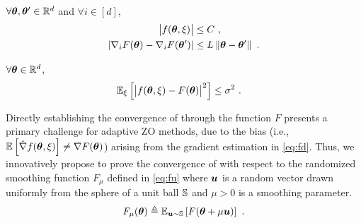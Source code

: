 \begin{assumption}\label{assump:1}
$\forall {\bm{\theta}},{\bm{\theta}}' \in \mathbb{R}^d$ and $\forall i \in [d]$,
\begin{align}
\big|f({\bm{\theta}}, \xi)\big| &\leq C \ , \\[1pt]
\left|\nabla_i F({\bm{\theta}}) - \nabla_i F({\bm{\theta}}')\right| &\leq L\left\|{\bm{\theta}} - {\bm{\theta}}'\right\| \ . \label{eq:smoothness}
\end{align}
\end{assumption} 
\begin{assumption}\label{assump:2}
$\forall{{\bm{\theta}}} \in \mathbb{R}^d$,
\begin{align}
\mathbb{E}_{\xi}\left[\big|f({\bm{\theta}}, \xi) - F({\bm{\theta}})\big|^2\right] &\leq \sigma^2 \ . \label{eq:variance}
\end{align}
\end{assumption}

Directly establishing the convergence of \ours{} through the function $F$ presents a primary challenge for adaptive ZO methods, due to the bias (i.e., $\mathbb{E}\left[\hat{\nabla}f({\bm{\theta}},\xi)\right] \neq \nabla F({\bm{\theta}})$) arising from the gradient estimation in \eqref{eq:fd}. Thus, we innovatively propose to prove the convergence of \ours{} with respect to the randomized smoothing function $F_{\mu}$ defined in \eqref{eq:fu} where ${\bm{u}}$ is a random vector drawn uniformly from the sphere of a unit ball ${\mathbb{S}}$ and $\mu > 0$ is a smoothing parameter.
\begin{equation}\label{eq:fu}
F_{\mu}({\bm{\theta}}) \triangleq \mathbb{E}_{{\bm{u}} \sim {\mathbb{S}}}\left[F({\bm{\theta}} + \mu {\bm{u}})\right] \ .
\end{equation}

